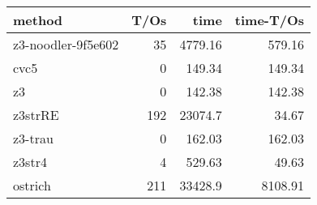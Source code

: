 \begin{tabular}{lrrr}
\hline
 method             &   T/Os &     time &   time-T/Os \\
\hline
 z3-noodler-9f5e602 &     35 &  4779.16 &      579.16 \\
 cvc5               &      0 &   149.34 &      149.34 \\
 z3                 &      0 &   142.38 &      142.38 \\
 z3strRE            &    192 & 23074.7  &       34.67 \\
 z3-trau            &      0 &   162.03 &      162.03 \\
 z3str4             &      4 &   529.63 &       49.63 \\
 ostrich            &    211 & 33428.9  &     8108.91 \\
\hline
\end{tabular}
